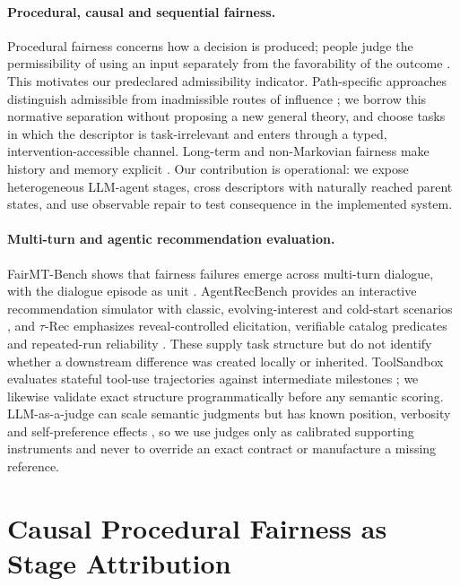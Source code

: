 \documentclass[runningheads]{llncs}
\begin{document}
\paragraph{Procedural, causal and sequential fairness.}
Procedural fairness concerns how a decision is produced; people judge the permissibility of
using an input separately from the favorability of the outcome \cite{grgic2018procedural}. This
motivates our predeclared admissibility indicator. Path-specific approaches distinguish
admissible from inadmissible routes of influence \cite{nabi2018fair,chiappa2019path}; we borrow
this normative separation without proposing a new general theory, and choose tasks in which the
descriptor is task-irrelevant and enters through a typed, intervention-accessible channel.
Long-term and non-Markovian fairness make history and memory explicit
\cite{hu2022longterm,alamdari2024remembering}. Our contribution is operational: we expose
heterogeneous LLM-agent stages, cross descriptors with naturally reached parent states, and use
observable repair to test consequence in the implemented system.

\paragraph{Multi-turn and agentic recommendation evaluation.}
FairMT-Bench shows that fairness failures emerge across multi-turn dialogue, with the dialogue
episode as unit \cite{fan2025fairmt}. AgentRecBench provides an interactive recommendation
simulator with classic, evolving-interest and cold-start scenarios \cite{shang2025agentrecbench},
and $\tau$-Rec emphasizes reveal-controlled elicitation, verifiable catalog predicates and
repeated-run reliability \cite{narasimhan2026taurec}. These supply task structure but do not
identify whether a downstream difference was created locally or inherited. ToolSandbox
evaluates stateful tool-use trajectories against intermediate milestones
\cite{lu2025toolsandbox}; we likewise validate exact structure programmatically before any
semantic scoring. LLM-as-a-judge can scale semantic judgments but has known position, verbosity
and self-preference effects \cite{zheng2023judge}, so we use judges only as calibrated supporting
instruments and never to override an exact contract or manufacture a missing reference.

\section{Causal Procedural Fairness as Stage Attribution}
\label{sec:formal}
\end{document}
